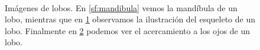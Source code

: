 \documentclass[12pt]{article}
\begin{document}
\begin{figure}[h]
\begin{subfigure}[t]{0.3\textwidth}
                 \label{sf:esqueleto}
        \end{subfigure}
        ~
        \begin{subfigure}[t]{0.3\textwidth}
                \centering
                \label{sf:closeup}
        \end{subfigure}
        \caption{Imágenes de lobos. En \ref{sf:mandibula} vemos la mandíbula de un lobo, mientras que en \ref{sf:esqueleto} observamos la ilustración del esqueleto de un lobo. Finalmente en \ref{sf:closeup} podemos ver el acercamiento a los ojos de un lobo.}\label{fig:animals}
\end{figure}
\end{document}
